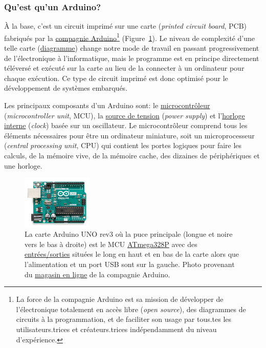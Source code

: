 \documentclass[english,french,12pt]{article}
\begin{document}
\subsubsection*{Qu'est qu'un Arduino?}
À la base, c'est un circuit imprimé sur une carte (\textit{printed circuit board}, PCB) fabriqués par la \href{https://www.arduino.cc/}{ compagnie Arduino}\footnote{La force de la compagnie Arduino est sa mission de développer de l'électronique totalement en accès libre (\textit{open source}), des diagrammes de circuits à la programmation, et de faciliter son usage par tous.tes les utilisateurs.trices et créateurs.trices indépendamment du niveau d'expérience.} (Figure~\ref{fig:ArduinoUNO}). Le niveau de complexité d'une telle carte (\href{https://content.arduino.cc/assets/UNO-TH_Rev3e_sch.pdf}{diagramme}) change notre mode de travail en passant progressivement de l'électronique à l'informatique, mais le programme est en principe directement téléversé et exécuté sur la carte au lieu de la connecter à un ordinateur pour chaque exécution. Ce type de circuit imprimé est donc optimisé pour le développement de systèmes embarqués.

Les principaux composants d’un Arduino sont: le \href{https://en.wikipedia.org/wiki/Microcontroller}{microcontrôleur} (\textit{microcontroller unit}, MCU), la \href{https://electronics.stackexchange.com/questions/26484/how-arduino-power-supply-works}{source de tension} (\textit{power supply}) et l’\href{https://en.wikipedia.org/wiki/Clock_signal}{horloge interne} (\textit{clock}) basée sur un oscillateur. Le microcontrôleur comprend tous les éléments nécessaires pour être un ordinateur miniature, soit un microprocesseur (\textit{central processing unit}, CPU) qui contient les portes logiques pour faire les calculs, de la mémoire vive, de la mémoire cache, des dizaines de périphériques et une horloge.

\begin{figure}[h]
    \centering
    \includegraphics[width=0.3\textwidth]{ArduinoUNO.jpg}
    \caption{La carte Arduino UNO rev3 où la puce principale (longue et noire vers le bas à droite) est le MCU \href{http://ww1.microchip.com/downloads/en/DeviceDoc/Atmel-7810-Automotive-Microcontrollers-ATmega328P_Datasheet.pdf}{ATmega328P} avec des \href{https://www.circuito.io/blog/arduino-uno-pinout/}{ entrées/sorties} situées le long en haut et en bas de la carte alors que l'alimentation et un port USB sont sur la gauche. Photo provenant du \href{https://store.arduino.cc/usa/}{magasin en ligne} de la compagnie Arduino.}
    \label{fig:ArduinoUNO}
\end{figure}
\end{document}
